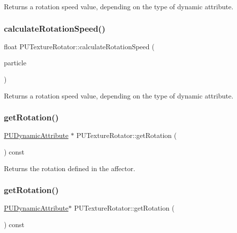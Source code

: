 Returns a rotation speed value, depending on the type of dynamic attribute. \mbox{\label{classPUTextureRotator_a7ffc7eb5ca88b68d6a8fc6d1ce9b8048}} 
\subsubsection{\texorpdfstring{calculate\+Rotation\+Speed()}{calculateRotationSpeed()}\hspace{0.1cm}{\footnotesize\ttfamily [2/2]}}
{\footnotesize\ttfamily float P\+U\+Texture\+Rotator\+::calculate\+Rotation\+Speed (\begin{DoxyParamCaption}\item[{\hyperlink{structPUParticle3D}{P\+U\+Particle3D} $\ast$}]{particle }\end{DoxyParamCaption})}

Returns a rotation speed value, depending on the type of dynamic attribute. \mbox{\label{classPUTextureRotator_af9f390e83dd0aa9de85038af85bcf21b}} 
\subsubsection{\texorpdfstring{get\+Rotation()}{getRotation()}\hspace{0.1cm}{\footnotesize\ttfamily [1/2]}}
{\footnotesize\ttfamily \hyperlink{classPUDynamicAttribute}{P\+U\+Dynamic\+Attribute} $\ast$ P\+U\+Texture\+Rotator\+::get\+Rotation (\begin{DoxyParamCaption}\item[{void}]{ }\end{DoxyParamCaption}) const}

Returns the rotation defined in the affector. \mbox{\label{classPUTextureRotator_afb1a5a3c542205ca4da995ac4eff7dc2}} 
\subsubsection{\texorpdfstring{get\+Rotation()}{getRotation()}\hspace{0.1cm}{\footnotesize\ttfamily [2/2]}}
{\footnotesize\ttfamily \hyperlink{classPUDynamicAttribute}{P\+U\+Dynamic\+Attribute}$\ast$ P\+U\+Texture\+Rotator\+::get\+Rotation (\begin{DoxyParamCaption}\item[{void}]{ }\end{DoxyParamCaption}) const}

